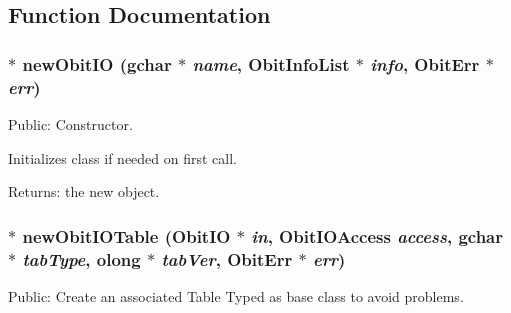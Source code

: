 \subsection{Function Documentation}
\subsubsection{$\ast$ new\-Obit\-IO (gchar $\ast$ {\em name}, {\bf Obit\-Info\-List} $\ast$ {\em info}, {\bf Obit\-Err} $\ast$ {\em err})}\label{ObitIO_8c_a6}


Public: Constructor. 

Initializes class if needed on first call. \begin{Desc}
\item[Returns:]the new object. \end{Desc}
\subsubsection{$\ast$ new\-Obit\-IOTable ({\bf Obit\-IO} $\ast$ {\em in}, Obit\-IOAccess {\em access}, gchar $\ast$ {\em tab\-Type}, {\bf olong} $\ast$ {\em tab\-Ver}, {\bf Obit\-Err} $\ast$ {\em err})}\label{ObitIO_8c_a30}


Public: Create an associated Table Typed as base class to avoid problems. 

